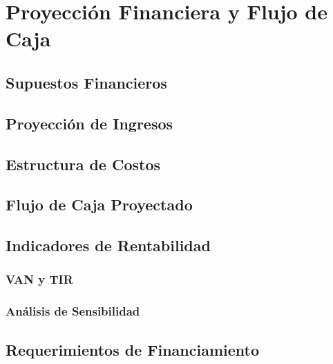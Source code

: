 
\chapter{Proyección Financiera y Flujo de Caja}
\label{chap:cashflow}

\section{Supuestos Financieros}
\label{sec:supuestos-financieros}

\section{Proyección de Ingresos}
\label{sec:proyeccion-ingresos}

\section{Estructura de Costos}
\label{sec:estructura-costos}

\section{Flujo de Caja Proyectado}
\label{sec:flujo-caja}

\section{Indicadores de Rentabilidad}
\label{sec:indicadores-rentabilidad}

\subsection{VAN y TIR}
\label{subsec:van-tir}

\subsection{Análisis de Sensibilidad}
\label{subsec:sensibilidad}

\section{Requerimientos de Financiamiento}
\label{sec:financiamiento}
